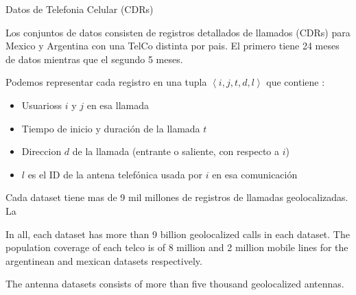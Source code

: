 \documentclass{beamer}
\begin{document}
\begin{frame}{Datos de Telefonia Celular (CDRs)}


Los conjuntos de datos consisten de registros detallados de llamados (CDRs) para Mexico y Argentina con una TelCo distinta por pais. El primero tiene 24 meses de datos mientras que el segundo 5 meses.


\medskip
Podemos representar cada registro en una tupla $\left < i, j, t, d, l \right >$ que contiene :
\begin{itemize}
	\item Usuarioss $i$ y $j$ en esa llamada
	\item Tiempo de inicio y duración de la llamada $t$
	\item Direccion $d$ de la llamada (entrante o saliente, con respecto a $i$)
	\item $l$ es el ID de la antena telefónica usada por $i$ en esa comunicación
\end{itemize}

\medskip

Cada dataset tiene mas de 9 mil millones de registros de llamadas geolocalizadas. La 

In all, each dataset has more than 9 billion geolocalized calls in each dataset. The population coverage of each telco is of 8 million and 2 million mobile lines for the argentinean and mexican datasets respectively.

\medskip
The antenna datasets consists of more than five thousand geolocalized antennas.

\end{frame}

\end{document}
